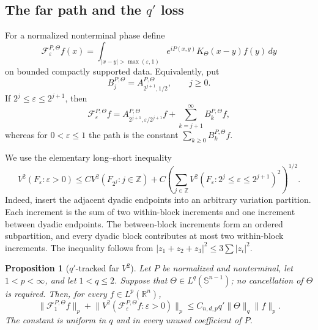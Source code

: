 \documentclass[11pt]{article}
\numberwithin{equation}{section}
\newtheorem{proposition}[theorem]{Proposition}
\theoremstyle{remark}
\theoremstyle{definition}
\newcommand{\R}{\mathbb R}
\newcommand{\Sph}{\mathbb S}
\newcommand{\cF}{\mathcal F}
\newcommand{\norm}[1]{\lVert #1\rVert}
\begin{document}
\subsection{The far path and the \texorpdfstring{$q'$}{q-prime} loss}

For a normalized nonterminal phase define
\begin{equation}\label{eq:strong-far-path}
 \cF^{P,\Theta}_\varepsilon f(x)=
 \int_{|x-y|>\max(\varepsilon,1)}
 e^{iP(x,y)}K_\Theta(x-y)f(y)\,dy
\end{equation}
on bounded compactly supported data.  Equivalently, put
\begin{equation}\label{eq:strong-far-Bj}
 B_j^{P,\Theta}=A^{P,\Theta}_{2^{j+1},1/2},
 \qquad j\geq0.
\end{equation}
If $2^j\leq\varepsilon\leq2^{j+1}$, then
\begin{equation}\label{eq:strong-far-series}
 \cF^{P,\Theta}_\varepsilon f
 =A^{P,\Theta}_{2^{j+1},\varepsilon/2^{j+1}}f
  +\sum_{k=j+1}^\infty B_k^{P,\Theta}f,
\end{equation}
whereas for $0<\varepsilon\leq1$ the path is the constant
$\sum_{k\geq0}B_k^{P,\Theta}f$.

We use the elementary long--short inequality
\begin{equation}\label{eq:V2-long-short}
 V^2(F_\varepsilon:\varepsilon>0)
 \leq C V^2(F_{2^j}:j\in\mathbb Z)
 +C\left(\sum_{j\in\mathbb Z}
 V^2(F_\varepsilon:2^j\leq\varepsilon\leq2^{j+1})^2
 \right)^{1/2}.
\end{equation}
Indeed, insert the adjacent dyadic endpoints into an arbitrary variation
partition.  Each increment is the sum of two within-block increments and
one increment between dyadic endpoints.  The between-block increments
form an ordered subpartition, and every dyadic block contributes at most
two within-block increments.  The inequality follows from
$|z_1+z_2+z_3|^2\leq3\sum|z_i|^2$.

\begin{proposition}[$q'$-tracked far \(V^2\)]
\label{prop:strong-far-q}
Let $P$ be normalized and nonterminal, let $1<p<\infty$, and let
$1<q\leq2$.  Suppose that $\Theta\in L^q(\Sph^{n-1})$; no cancellation
of $\Theta$ is required.  Then, for every $f\in L^p(\R^n)$,
\begin{equation}\label{eq:strong-far-q}
 \norm{\cF^{P,\Theta}_1f}_p
 +\norm{V^2(\cF^{P,\Theta}_\varepsilon f:\varepsilon>0)}_p
 \leq C_{n,d,p}q'\norm\Theta_q\norm f_p.
\end{equation}
The constant is uniform in $q$ and in every unused coefficient of $P$.
\end{proposition}
\end{document}
